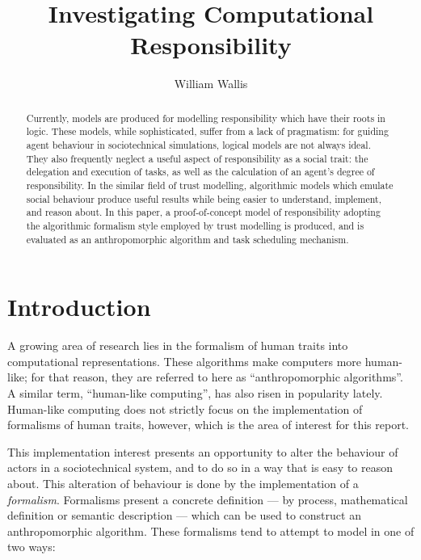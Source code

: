 



\title{Investigating Computational Responsibility}
\author{William Wallis}

\maketitle

\begin{abstract}
    Currently, models are produced for modelling responsibility which have their roots in logic. These models, while sophisticated, suffer from a lack of pragmatism: for guiding agent behaviour in sociotechnical simulations, logical models are not always ideal. They also frequently neglect a useful aspect of responsibility as a social trait: the delegation and execution of tasks, as well as the calculation of an agent's degree of responsibility. In the similar field of trust modelling, algorithmic models which emulate social behaviour produce useful results while being easier to understand, implement, and reason about. In this paper, a proof-of-concept model of responsibility adopting the algorithmic formalism style employed by trust modelling is produced, and is evaluated as an anthropomorphic algorithm and task scheduling mechanism.
\end{abstract}

\section{Introduction}
A growing area of research lies in the formalism of human traits into computational representations. These algorithms make computers more human-like; for that reason, they are referred to here as ``anthropomorphic algorithms''. A similar term, ``human-like computing'', has also risen in popularity lately. Human-like computing does not strictly focus on the implementation of formalisms of human traits, however, which is the area of interest for this report.\par

This implementation interest presents an opportunity to alter the behaviour of actors in a sociotechnical system, and to do so in a way that is easy to reason about. This alteration of behaviour is done by the implementation of a \emph{formalism}. Formalisms present a concrete definition --- by process, mathematical definition or semantic description --- which can be used to construct an anthropomorphic algorithm. These formalisms tend to attempt to model in one of two ways:

